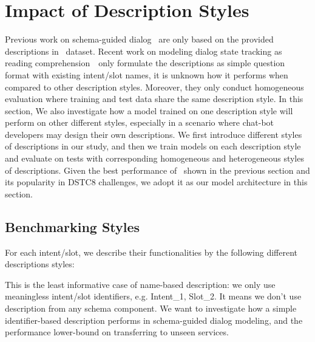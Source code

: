 \section{Impact of Description Styles}
\label{sec:sgd:abl-desc}
Previous work on schema-guided dialog~\cite{rastogi2020schema} are
only based on the provided descriptions in \sgdst~dataset. Recent work
on modeling dialog state tracking as reading
comprehension~\cite{gao2019dialog}~only formulate the descriptions as
simple question format with existing intent/slot names, it is unknown
how it performs when compared to other description styles. Moreover,
they only conduct homogeneous evaluation where training and test data
share the same description style. In this section, We also investigate
how a model trained on one description style will perform on other
different styles, especially in a scenario where chat-bot developers
may design their own descriptions. We first introduce different styles
of descriptions in our study, and then we train models on each
description style and evaluate on tests with corresponding homogeneous
and heterogeneous styles of descriptions. Given the best performance
of \CE~shown in the previous section and its popularity in DSTC8
challenges, we adopt it as our model architecture in this section.

\subsection{Benchmarking Styles}
\label{ssec:desc-styles}
For each intent/slot, we describe their functionalities by the
following different descriptions styles:

\Paragraph{\ID} This is the least informative case of name-based
description: we only use meaningless intent/slot identifiers,
e.g. Intent\_1, Slot\_2. It means we don't use description from any
schema component. We want to investigate how a simple identifier-based
description performs in schema-guided dialog modeling, and the
performance lower-bound on transferring to unseen services.

